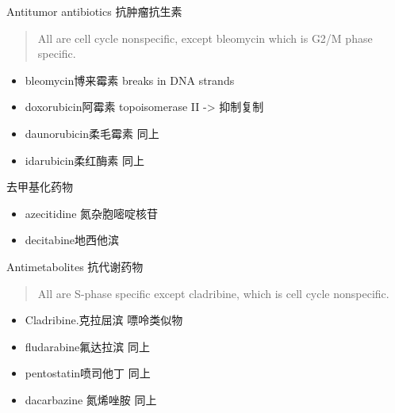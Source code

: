 \documentclass[
  ignorenonframetext,
]{beamer}
\begin{document}
\begin{frame}
\begin{block}{Antitumor antibiotics 抗肿瘤抗生素}
\protect\hypertarget{antitumor-antibiotics-ux6297ux80bfux7624ux6297ux751fux7d20}{}
\begin{quote}
All are cell cycle nonspecific, except bleomycin which is G2/M phase
specific.
\end{quote}

\begin{itemize}
\item
  bleomycin博来霉素 breaks in DNA strands
\item
  doxorubicin阿霉素 topoisomerase II -\textgreater{} 抑制复制
\item
  daunorubicin柔毛霉素 同上
\item
  idarubicin柔红酶素 同上
\end{itemize}
\end{block}
\end{frame}

\begin{frame}
\begin{block}{去甲基化药物}
\protect\hypertarget{ux53bbux7532ux57faux5316ux836fux7269}{}
\begin{itemize}
\item
  azecitidine 氮杂胞嘧啶核苷
\item
  decitabine地西他滨
\end{itemize}
\end{block}
\end{frame}

\begin{frame}
\begin{block}{Antimetabolites 抗代谢药物}
\protect\hypertarget{antimetabolites-ux6297ux4ee3ux8c22ux836fux7269}{}
\begin{quote}
All are S-phase specific except cladribine, which is cell cycle
nonspecific.
\end{quote}

\begin{itemize}
\item
  Cladribine.克拉屈滨 嘌呤类似物
\item
  fludarabine氟达拉滨 同上
\item
  pentostatin喷司他丁 同上
\item
  dacarbazine 氮烯唑胺 同上
\end{itemize}
\end{block}
\end{frame}
\end{document}
